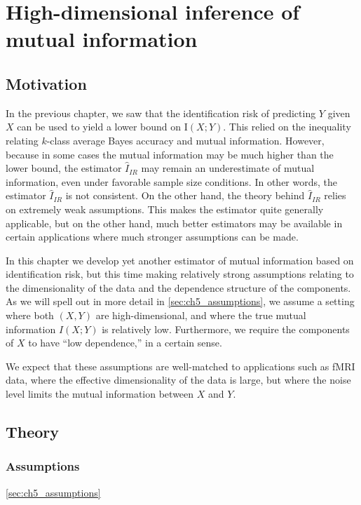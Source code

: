 
\chapter{High-dimensional inference of mutual information} %

\label{Chapter5} %

\section{Motivation}

In the previous chapter, we saw that the identification risk of
predicting $Y$ given $X$ can be used to yield a lower bound on
$\text{I}(X; Y)$.  This relied on the inequality relating $k$-class
average Bayes accuracy and mutual information.  However, because in
some cases the mutual information may be much higher than the lower
bound, the estimator $\hat{I}_{IR}$ may remain an underestimate of
mutual information, even under favorable sample size conditions.  In
other words, the estimator $\hat{I}_{IR}$ is not consistent.  On the
other hand, the theory behind $\hat{I}_{IR}$ relies on extremely weak
assumptions.  This makes the estimator quite generally applicable, but
on the other hand, much better estimators may be available in certain
applications where much stronger assumptions can be made.

In this chapter we develop yet another estimator of mutual information
based on identification risk, but this time making relatively strong
assumptions relating to the dimensionality of the data and the
dependence structure of the components.  As we will spell out in more
detail in \ref{sec:ch5_assumptions}, we assume a setting where both
$(X, Y)$ are high-dimensional, and where the true mutual information
$I(X; Y)$ is relatively low.  Furthermore, we require the components
of $X$ to have ``low dependence,'' in a certain sense.

We expect that these assumptions are well-matched to applications such
as fMRI data, where the effective dimensionality of the data is large,
but where the noise level limits the mutual information between $X$
and $Y$.

\section{Theory}

\subsection{Assumptions}\ref{sec:ch5_assumptions}

